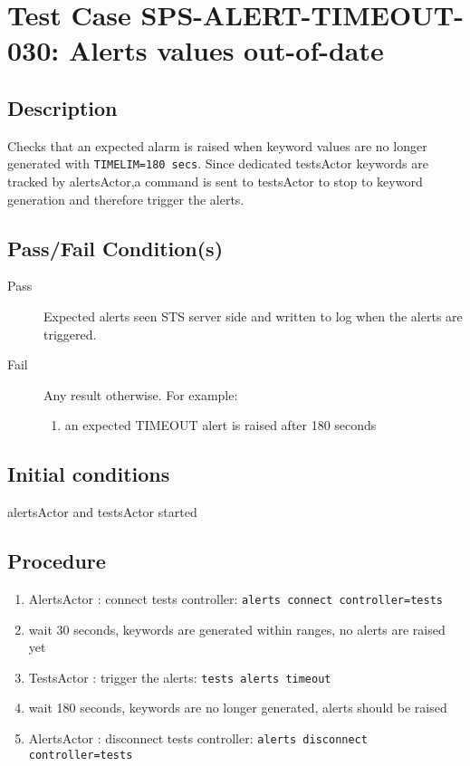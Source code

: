 \section{Test Case SPS-ALERT-TIMEOUT-030: Alerts values out-of-date}

\subsection{Description}

Checks that an expected alarm is raised when keyword values are no longer generated with \texttt{TIMELIM=180 secs}.
Since dedicated testsActor keywords are tracked by alertsActor,a command is sent to testsActor to stop to keyword generation and therefore trigger the alerts.



\subsection{Pass/Fail Condition(s)}

\begin{description}
\item [Pass] Expected alerts seen STS server side and written to log when the alerts are triggered.
\item [Fail] Any result otherwise. For example:

\begin{enumerate}
    \item an expected TIMEOUT alert is raised after 180 seconds

\end{enumerate}
\end{description}


\subsection{Initial conditions}

alertsActor and testsActor started

\subsection{Procedure}
\label{sec:alerts-proc}

\begin{enumerate}
    \item AlertsActor : connect tests controller: \texttt{alerts connect controller=tests}
    \item wait 30 seconds, keywords are generated within ranges, no alerts are raised yet
    \item TestsActor : trigger the alerts: \texttt{tests alerts timeout}
    \item wait 180 seconds, keywords are no longer generated, alerts should be raised
    \item AlertsActor : disconnect tests controller: \texttt{alerts disconnect controller=tests}
\end{enumerate}
